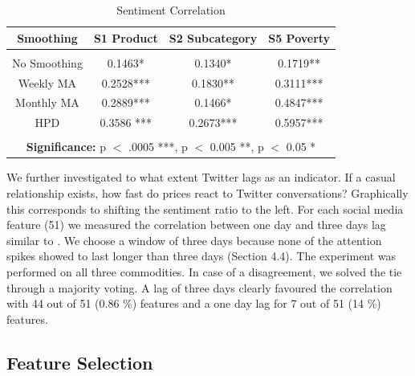 \begin{table}[h]   
\centering
 \begin{tabular}{  c  | c  | c | c }
            
    \textbf{Smoothing}  & \textbf{S1 Product} & \textbf{S2 Subcategory} &\textbf{S5 Poverty} \\
  \hline 
  &&& \\
  No Smoothing & 0.1463*  &   0.1340* &    0.1719**  \\
  
  Weekly MA &    0.2528***   & 0.1830** &   0.3111***\\

  Monthly MA &  0.2889***  & 0.1466* & 0.4847*** \\

  HPD &  0.3586 ***  &  0.2673*** &   0.5957***  \\
  

\hline 

\multicolumn{4}{c}{\null}\\

\multicolumn{4}{c}{\textbf{Significance:} p $<$ .0005 ***, p $<$ 0.005 **, p $<$ 0.05 *}\\
\hline  

\end{tabular}
\caption{Sentiment Correlation}
\label{tab:smoothing_corr}


\end{table}


We further investigated to what extent Twitter lags as an indicator. If a casual relationship exists, how fast do prices react to Twitter conversations? Graphically this corresponds to shifting the sentiment ratio to the left. For each social media feature (51) we measured the correlation between one day and three days lag similar to \cite{Si_exploitingtopic}. We choose a window of three days because  none of the attention spikes showed to last longer than three days (Section 4.4).  The experiment was performed on all three commodities. In case of a disagreement, we solved the tie through a majority voting. A 
 lag of three days clearly favoured the correlation with 44 out of 51 (0.86 \%) features and a one day lag for 7 out of 51 (14 \%) features. 


\subsection{Feature Selection}

